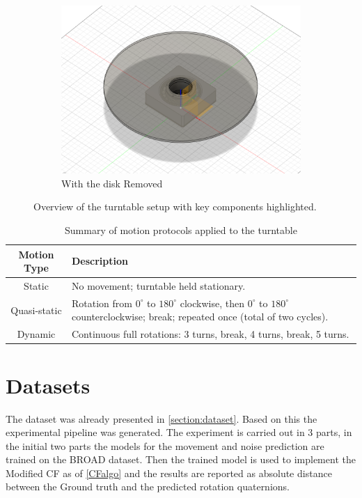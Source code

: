 \documentclass{iutbscthesis}
\begin{document}
\begin{figure}[h!]
\begin{subfigure}[b]{0.3\textwidth}
        \includegraphics[width=\textwidth]{Turntable_fusion.png}
        \caption{With the disk Removed}
        \label{fig:no disk}
    \end{subfigure}
    \caption{Overview of the turntable setup with key components highlighted.}
    \label{fig:turntable_overview}
\end{figure}


\begin{table}[h!]
\centering
\caption{Summary of motion protocols applied to the turntable}
    \begin{tabular}{|c|p{10cm}|}
    \hline
    \textbf{Motion Type} & \textbf{Description} \\
    \hline
    Static & No movement; turntable held stationary. \\
    \hline
    Quasi-static & Rotation from $0^{\circ}$ to $180^{\circ}$ clockwise, then $0^{\circ}$ to $180^{\circ}$ counterclockwise; break; repeated once (total of two cycles). \\
    \hline
    Dynamic & Continuous full rotations: 3 turns, break, 4 turns, break, 5 turns. \\
    \hline
    \end{tabular}
\end{table}


\section{Datasets}
The dataset was already presented in \autoref{section:dataset}. Based on this the experimental pipeline was generated. The experiment is carried out in 3 parts, in the initial two parts the models for the movement and noise prediction are trained on the BROAD\cite{BROAD} dataset. Then the trained model is used to implement the Modified CF as of \autoref{CFalgo} and the results are reported as absolute distance between the Ground truth and the predicted rotation quaternions\cite{absoluteDistance}.
\end{document}
